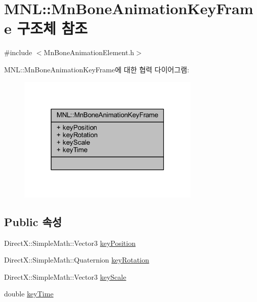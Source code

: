 \hypertarget{struct_m_n_l_1_1_mn_bone_animation_key_frame}{}\section{M\+NL\+:\+:Mn\+Bone\+Animation\+Key\+Frame 구조체 참조}
\label{struct_m_n_l_1_1_mn_bone_animation_key_frame}


{\ttfamily \#include $<$Mn\+Bone\+Animation\+Element.\+h$>$}



M\+NL\+:\+:Mn\+Bone\+Animation\+Key\+Frame에 대한 협력 다이어그램\+:\nopagebreak
\begin{figure}[H]
\begin{center}
\leavevmode
\includegraphics[width=247pt]{struct_m_n_l_1_1_mn_bone_animation_key_frame__coll__graph}
\end{center}
\end{figure}
\subsection*{Public 속성}
\begin{DoxyCompactItemize}
\item 
Direct\+X\+::\+Simple\+Math\+::\+Vector3 \hyperlink{struct_m_n_l_1_1_mn_bone_animation_key_frame_a322f5dacc90354870a569e3ad80d3ff6}{key\+Position}
\item 
Direct\+X\+::\+Simple\+Math\+::\+Quaternion \hyperlink{struct_m_n_l_1_1_mn_bone_animation_key_frame_a8ac33192c9eb7d8691540fceb3d0e1f9}{key\+Rotation}
\item 
Direct\+X\+::\+Simple\+Math\+::\+Vector3 \hyperlink{struct_m_n_l_1_1_mn_bone_animation_key_frame_ab79a35c4dfd72423eb6adff72d91e0c3}{key\+Scale}
\item 
double \hyperlink{struct_m_n_l_1_1_mn_bone_animation_key_frame_add992780bbdd3b047486ded8c0f8c953}{key\+Time}
\end{DoxyCompactItemize}



